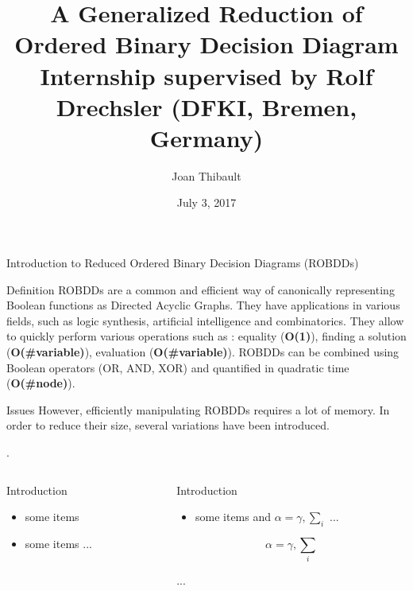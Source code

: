 \documentclass{beamer}
\title[GroBdd : A Generalized Reduction of Ordered Binary Decision Diagram]{A Generalized Reduction of Ordered Binary Decision Diagram\\
  {\small Internship supervised by Rolf Drechsler (DFKI, Bremen, Germany)}}
\author[Joan Thibault, joan.thibault@ens-rennes.fr, +33.6.21.70.56.71]{Joan Thibault}
\date{July 3, 2017}
\begin{document}
\begin{frame}{} 
\maketitle
\vfill
\begin{block}{\large Introduction to Reduced Ordered Binary Decision Diagrams (ROBDDs)}
\begin{block}{Definition}
ROBDDs are a common and efficient way of canonically representing Boolean functions as Directed Acyclic Graphs.
They have applications in various fields, such as logic synthesis, artificial intelligence and combinatorics. 
They allow to quickly perform various operations such as : equality (\textbf{O(1)}), finding a solution (\textbf{O(\#variable)}), evaluation (\textbf{O(\#variable)}).
ROBDDs can be combined using Boolean operators (OR, AND, XOR) and quantified in quadratic time (\textbf{O(\#node)}).
\end{block}
\begin{block}{Issues}
However, efficiently manipulating ROBDDs requires a lot of memory.
In order to reduce their size, several variations have been introduced.
\end{block}
\begin{block}{}
\end{block}
\end{block}.
 
    \vfill
    \begin{columns}[t]
      \begin{column}{.40\linewidth}
        \begin{block}{Introduction}
          \begin{itemize}
          \item some items
          \item some items
          ...
          \end{itemize}
        \end{block}
      \end{column}
      \begin{column}{.40\linewidth}
        \begin{block}{Introduction}
          \begin{itemize}
          \item some items and $\alpha=\gamma, \sum_{i}$
          ...
          \end{itemize}
          $$\alpha=\gamma, \sum_{i}$$
        \end{block}
        ...
 
      \end{column}
    \end{columns}
    
    
  \end{frame}
\end{document}
